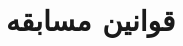 \documentclass[a4paper,12pt]{report}
\begin{document}
	\subsection{}\label{subsec1:sec1:chap1}


	\chapter{
		قوانین مسابقه
	}\label{chap2}






	\nocite{*}
	
	
\end{document}
